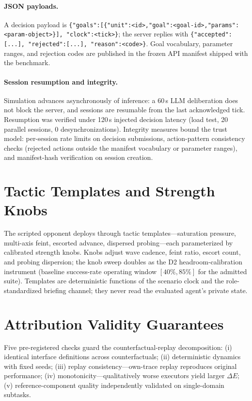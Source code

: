 \documentclass[sigconf,anonymous]{aamas}
\begin{document}
\paragraph{JSON payloads.}
A decision payload is \texttt{\small\{"goals":[\allowbreak\{"unit":<id>\allowbreak,"goal":<goal-id>\allowbreak,"params":<param-object>\}]\allowbreak, "clock":<tick>\}}; the server replies with \texttt{\small\{"accepted":[...]\allowbreak, "rejected":[...]\allowbreak, "reason":<code>\}}. Goal vocabulary, parameter ranges, and rejection codes are published in the frozen API manifest shipped with the benchmark.

\paragraph{Session resumption and integrity.}
Simulation advances asynchronously of inference: a 60\,s LLM deliberation does not block the server, and sessions are resumable from the last acknowledged tick. Resumption was verified under 120\,s injected decision latency (load test, 20 parallel sessions, 0 desynchronizations). Integrity measures bound the trust model: per-session rate limits on decision submissions, action-pattern consistency checks (rejected actions outside the manifest vocabulary or parameter ranges), and manifest-hash verification on session creation.

\section{Tactic Templates and Strength Knobs}\label{app:C}

The scripted opponent deploys through tactic templates---saturation pressure, multi-axis feint, escorted advance, dispersed probing---each parameterized by calibrated strength knobs. Knobs adjust wave cadence, feint ratio, escort count, and probing dispersion; the knob sweep doubles as the D2 headroom-calibration instrument (baseline success-rate operating window $[40\%, 85\%]$ for the admitted suite). Templates are deterministic functions of the scenario clock and the role-standardized briefing channel; they never read the evaluated agent's private state.

\section{Attribution Validity Guarantees}\label{app:D}

Five pre-registered checks guard the counterfactual-replay decomposition: (i) identical interface definitions across counterfactuals; (ii) deterministic dynamics with fixed seeds; (iii) replay consistency---own-trace replay reproduces original performance; (iv) monotonicity---qualitatively worse executors yield larger $\Delta E$; (v) reference-component quality independently validated on single-domain subtasks.
\end{document}

